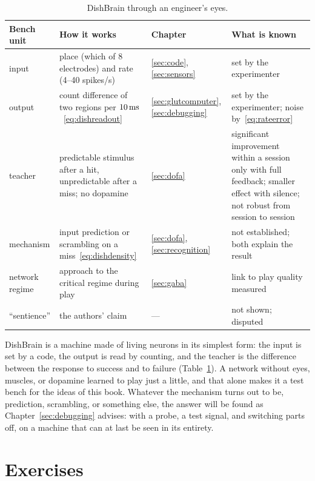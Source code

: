 \begin{table}[t]
\centering
\footnotesize
\setlength{\tabcolsep}{4pt}
\renewcommand{\arraystretch}{1.15}
\begin{tabular}{>{\raggedright}p{2.1cm}>{\raggedright}p{4.2cm}>{\raggedright}p{1.9cm}>{\raggedright\arraybackslash}p{4.6cm}}
\toprule
Bench unit & How it works & Chapter & What is known \\
\midrule
input & place (which of 8 electrodes) and rate (4--40 spikes/s) & \ref{sec:code}, \ref{sec:sensors} & set by the experimenter \\
output & count difference of two regions per $10\,\text{ms}$~\eqref{eq:dishreadout} & \ref{sec:glutcomputer}, \ref{sec:debugging} & set by the experimenter; noise by~\eqref{eq:rateerror} \\
teacher & predictable stimulus after a hit, unpredictable after a miss; no dopamine & \ref{sec:dofa} & significant improvement within a session only with full feedback; smaller effect with silence; not robust from session to session \\
mechanism & input prediction or scrambling on a miss~\eqref{eq:dishdensity} & \ref{sec:dofa}, \ref{sec:recognition} & not established; both explain the result \\
network regime & approach to the critical regime during play & \ref{sec:gaba} & link to play quality measured \\
``sentience'' & the authors' claim & --- & not shown; disputed \\
\bottomrule
\end{tabular}
\caption{DishBrain through an engineer's eyes.}
\label{tab:dishbrain}
\end{table}

DishBrain is a machine made of living neurons in its simplest form: the input is set by a code, the output is read by counting, and the teacher is the difference between the response to success and to failure (Table~\ref{tab:dishbrain}). A network without eyes, muscles, or dopamine learned to play just a little, and that alone makes it a test bench for the ideas of this book. Whatever the mechanism turns out to be, prediction, scrambling, or something else, the answer will be found as Chapter~\ref{sec:debugging} advises: with a probe, a test signal, and switching parts off, on a machine that can at last be seen in its entirety.

\section{Exercises}

